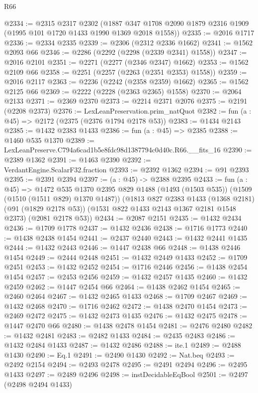 \begin{lexlean}{R66}
\begin{coremodule}
@2334 := @2315
    @2317
    @2302
    (@1887 @347 @1708 @2090 @1879 @2316 @1909 (@1995 @101 @1720 @1433 @1990 @1369 @2018 @1558))
@2335 := @2016 @1717
@2336 := @2334 @2335
@2339 := @2306 (@2312 @2336 @1662)
@2341 := @1562 @2093 @66
@2346 := @2286 (@2292 (@2298 (@2339 @2341) @1558))
@2347 := @2016 @2101
@2351 := @2271 (@2277 (@2346 @2347) @1662)
@2353 := @1562 @2109 @66
@2358 := @2251 (@2257 (@2263 (@2351 @2353) @1558))
@2359 := @2016 @2117
@2363 := @2236 (@2242 (@2358 @2359) @1662)
@2365 := @1562 @2125 @66
@2369 := @2222 (@2228 (@2363 @2365) @1558)
@2370 := @2064 @2133
@2371 := @2369 @2370
@2373 := @2214 @2371 @2076
@2375 := @2191 (@2208 @2373)
@2376 := LexLeanPreservation.prim_natQuot
@2382 := fun (a : @45) => @2172 (@2375 (@2376 @1794 @2178 @53))
@2383 := @1434 @2143
@2385 := @1432 @2383 @1433
@2386 := fun (a : @45) => @2385
@2388 := @1460 @535 @1370
@2389 := LexLeanPreserve.C794a6cad1b5e8fdc98d1387794c0d40c.R66.__fits_16
@2390 := @2389 @1362
@2391 := @1463 @2390
@2392 := VerdantEngine.ScalarF32.fraction
@2393 := @2392 @1362
@2394 := @91 @2393
@2395 := @2391 @2394
@2397 := (a : @45) -> @2388 @2395
@2433 := fun (a : @45) =>
  @1472
    @535
    @1370
    @2395
    @829
    @1488
    (@1493 (@1503 @535))
    (@1509 (@1510 (@1511 @829) @1370 @1487))
    (@1813
      @827
      @2383
      @1433
      (@1368 @2181)
      (@91 (@1829 @2178 @53))
      (@1531 @822 @1433 @2143 @1367 @2181 @1548 @2373)
      (@2081 @2178 @53))
@2434 := @2087 @2151
@2435 := @1432 @2434
@2436 := @1709 @1778
@2437 := @1432 @2436
@2438 := @1716 @1773
@2440 := @1438 @2438 @1454
@2441 := @2437 @2440
@2443 := @1432 @2441 @1435
@2444 := @1432 @2443
@2446 := @1447 @2438 @66
@2448 := @1438 @2446 @1454
@2449 := @2444 @2448
@2451 := @1432 @2449 @1433
@2452 := @1709 @2451
@2453 := @1432 @2452
@2454 := @1716 @2446
@2456 := @1438 @2454 @1454
@2457 := @2453 @2456
@2459 := @1432 @2457 @1435
@2460 := @1432 @2459
@2462 := @1447 @2454 @66
@2464 := @1438 @2462 @1454
@2465 := @2460 @2464
@2467 := @1432 @2465 @1433
@2468 := @1709 @2467
@2469 := @1432 @2468
@2470 := @1716 @2462
@2472 := @1438 @2470 @1454
@2473 := @2469 @2472
@2475 := @1432 @2473 @1435
@2476 := @1432 @2475
@2478 := @1447 @2470 @66
@2480 := @1438 @2478 @1454
@2481 := @2476 @2480
@2482 := @1432 @2481
@2483 := @2482 @1433
@2484 := @2435 @2483
@2486 := @1432 @2484 @1433
@2487 := @1432 @2486
@2488 := ite.{1}
@2489 := @2488 @1430
@2490 := Eq.{1}
@2491 := @2490 @1430
@2492 := Nat.beq
@2493 := @2492 @2154
@2494 := @2493 @2478
@2495 := @2491 @2494
@2496 := @2495 @1433
@2497 := @2489 @2496
@2498 := instDecidableEqBool
@2501 := @2497 (@2498 @2494 @1433)

\end{coremodule}
\end{lexlean}
